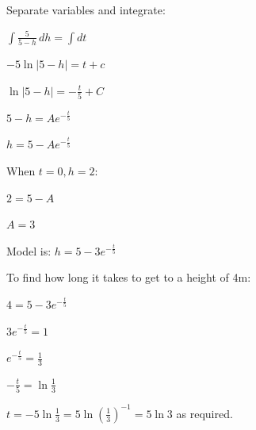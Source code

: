 \documentclass[../main.tex]{subfiles}
\begin{document}
\begin{spacing}{1.5}
\begin{enumerate}[itemsep=0.7cm]
    Separate variables and integrate:

    $\int \frac{5}{5-h}\,dh=\int dt$

    $-5\ln{|5-h|}=t+c$

    $\ln{|5-h|}=-\frac{t}{5}+C$

    $5-h=Ae^{-\frac{t}{5}}$

    $h=5-Ae^{-\frac{t}{5}}$

    When $t=0, h=2$:

    $2=5-A$

    $A=3$

    Model is: $h=5-3e^{-\frac{t}{5}}$

    To find how long it takes to get to a height of 4m:

    $4=5-3e^{-\frac{t}{5}}$

    $3e^{-\frac{t}{5}}=1$

    $e^{-\frac{t}{5}}=\frac{1}{3}$

    $-\frac{t}{5}=\ln{\frac{1}{3}}$

    $t=-5\ln{\frac{1}{3}}=5\ln{(\frac{1}{3})^{-1}}=5\ln{3}$ as required.


\end{enumerate}


\end{spacing}
\end{document}
